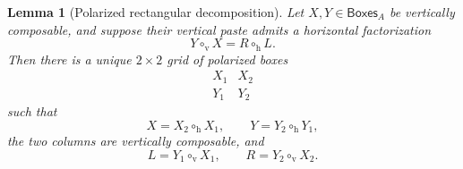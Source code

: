 \documentclass[oneside]{article}
\newcommand{\Boxes}{\mathsf{Boxes}}
\theoremstyle{plain}
\newtheorem{lemma}[theorem]{Lemma}
\theoremstyle{definition}
\theoremstyle{remark}
\begin{document}
\begin{lemma}[Polarized rectangular decomposition]
\label{lem:cgqg-game-rectangular-decomposition}
    Let \(X,Y\in\Boxes_A\) be vertically composable, and suppose their vertical paste admits a horizontal factorization
    \[
        Y\circ_{\mathrm v}X
        =
        R\circ_{\mathrm h}L.
    \]
    Then there is a unique \(2\times2\) grid of polarized boxes
    \[
        \begin{matrix}
            X_1 & X_2\\
            Y_1 & Y_2
        \end{matrix}
    \]
    such that
    \[
        X=X_2\circ_{\mathrm h}X_1,
        \qquad
        Y=Y_2\circ_{\mathrm h}Y_1,
    \]
    the two columns are vertically composable, and
    \[
        L=Y_1\circ_{\mathrm v}X_1,
        \qquad
        R=Y_2\circ_{\mathrm v}X_2.
    \]
\end{lemma}
\end{document}
